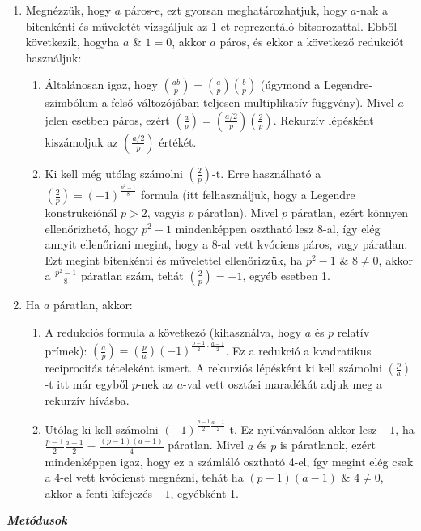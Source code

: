 \documentclass[hidelinks, 12pt]{article}
\begin{document}
\begin{enumerate}
	\item Megnézzük, hogy $a$ páros-e, ezt gyorsan meghatározhatjuk, hogy $a$-nak a bitenkénti és műveletét vizsgáljuk az $1$-et reprezentáló bitsorozattal. Ebből következik, hogyha $a$ \& $1 = 0$, akkor $a$ páros, és ekkor a következő redukciót használjuk:
	\begin{enumerate}
		\item  Általánosan igaz, hogy $\left({\frac{ab}{p}}\right) = \left({\frac{a}{p}}\right)\left({\frac{b}{p}}\right)$ (úgymond a Legendre-szimbólum a felső változójában teljesen multiplikatív függvény). Mivel $a$ jelen esetben páros, ezért $\left({\frac{a}{p}}\right) = \left({\frac{a/2}{p}}\right)\left({\frac{2}{p}}\right)$. Rekurzív lépésként kiszámoljuk az $\left({\frac{a/2}{p}}\right)$ értékét.
		\item Ki kell még utólag számolni $\left({\frac{2}{p}}\right)$-t. Erre használható a $\left({\frac{2}{p}}\right) = (-1)^{\frac{p^2-1}{8}}$ formula (itt felhasználjuk, hogy a Legendre konstrukciónál $p > 2$, vagyis $p$ páratlan). Mivel $p$ páratlan, ezért könnyen ellenőrizhető, hogy $p^2-1$ mindenképpen osztható lesz 8-al, így elég annyit ellenőrizni megint, hogy a 8-al vett kvóciens páros, vagy páratlan. Ezt megint bitenkénti és művelettel ellenőrizzük, ha $p^2-1$ \& $8 \not= 0$, akkor a $\frac{p^2-1}{8}$ páratlan szám, tehát $\left({\frac{2}{p}}\right) = -1$, egyéb esetben 1.
	\end{enumerate}
	\item Ha $a$ páratlan, akkor:
	\begin{enumerate}
		\item A redukciós formula a következő (kihasználva, hogy $a$ és $p$ relatív prímek): $\left({\frac{a}{p}}\right) = \left({\frac{p}{a}}\right) (-1)^{\frac{p-1}{2}\cdot\frac{a-1}{2}}$. Ez a redukció a kvadratikus reciprocitás tételeként ismert. A rekurziós lépésként ki kell számolni $\left({\frac{p}{a}}\right)$-t itt már egyből $p$-nek az $a$-val vett osztási maradékát adjuk meg a rekurzív hívásba.
		\item Utólag ki kell számolni $(-1)^{\frac{p-1}{2}\frac{a-1}{2}}$-t. Ez nyilvánvalóan akkor lesz $-1$, ha $\frac{p-1}{2}\frac{a-1}{2} = \frac{(p-1)(a-1)}{4}$ páratlan. Mivel $a$ és $p$ is páratlanok, ezért mindenképpen igaz, hogy ez a számláló osztható 4-el, így megint elég csak a 4-el vett kvócienst megnézni, tehát ha $(p-1)(a-1)$ \& $4 \not=0$, akkor a fenti kifejezés $-1$, egyébként 1.
	\end{enumerate}
\end{enumerate}
\textbf{\textit{Metódusok}}
\end{document}

